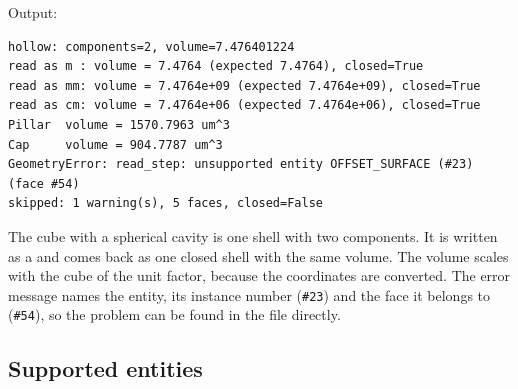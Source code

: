 
Output:

\begin{lstlisting}[style=text]
hollow: components=2, volume=7.476401224
read as m : volume = 7.4764 (expected 7.4764), closed=True
read as mm: volume = 7.4764e+09 (expected 7.4764e+09), closed=True
read as cm: volume = 7.4764e+06 (expected 7.4764e+06), closed=True
Pillar  volume = 1570.7963 um^3
Cap     volume = 904.7787 um^3
GeometryError: read_step: unsupported entity OFFSET_SURFACE (#23) (face #54)
skipped: 1 warning(s), 5 faces, closed=False
\end{lstlisting}

The cube with a spherical cavity is one shell with two components. It is written as a
 and comes back as one closed shell with the same volume. The volume
scales with the cube of the unit factor, because the coordinates are converted. The error
message names the entity, its instance number (\texttt{\#23}) and the face it belongs to
(\texttt{\#54}), so the problem can be found in the file directly.

\subsection{Supported entities}

